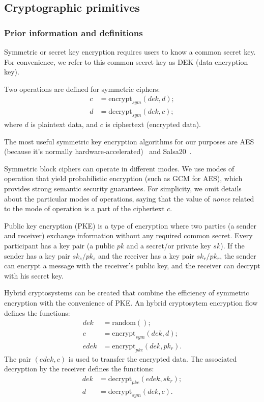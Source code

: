 \documentclass[notitlepage,longbibliography]{revtex4-1}
\begin{document}
\subsection{Cryptographic primitives}

\subsubsection{Prior information and definitions}

Symmetric or secret key encryption requires users to know a common secret key.
For convenience, we refer to this common secret key as DEK (data encryption key).

Two operations are defined for symmetric ciphers:
\begin{align}
    c &= \text{encrypt}_{sym}(dek, d);\\
    d &= \text{decrypt}_{sym}(dek, c);
\end{align}
where $d$ is plaintext data, and $c$ is ciphertext (encrypted data).

The most useful symmetric key encryption algorithms for our purposes are AES (because it's normally hardware-accelerated)~\cite{wiki:aes}
and Salsa20~\cite{wiki:salsa20}.

Symmetric block ciphers can operate in different modes.
We use modes of operation that yield probabilistic encryption (such as GCM for AES), which provides strong semantic security guarantees.
For simplicity, we omit details about the particular modes of operations, saying that the value of \emph{nonce} related to the mode of operation is a part of the
ciphertext $c$.

Public key encryption (PKE) is a type of encryption where two parties (a sender and receiver) exchange information without any required common secret.
Every participant has a key pair (a public $pk$ and a secret/or private key $sk$).
If the sender has a key pair $sk_s/pk_s$ and the receiver has a key pair $sk_r/pk_r$, the sender can encrypt a message with the receiver's public key,
and the receiver can decrypt with his secret key.

Hybrid cryptosystems can be created that combine the efficiency of symmetric encryption with the convenience of PKE.
An hybrid cryptosytem encryption flow defines the functions:
\begin{align}
    dek &= \text{random}();\\
    c &= \text{encrypt}_{sym}(dek, d);\\
    edek &= \text{encrypt}_{pke}(dek, pk_r).
\end{align}
The pair $(edek, c)$ is used to transfer the encrypted data.
The associated decryption by the receiver defines the functions:
\begin{align}
    dek &= \text{decrypt}_{pke}(edek, sk_r);\\
    d &= \text{decrypt}_{sym}(dek, c).
\end{align}
\end{document}
